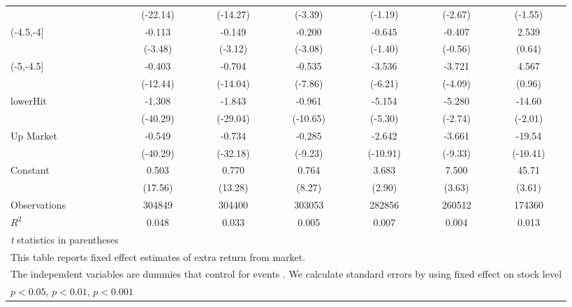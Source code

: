 {\begin{tabular}{l*{6}{c}}
                    &    (-22.14)         &    (-14.27)         &     (-3.39)         &     (-1.19)         &     (-2.67)         &     (-1.55)         \\
[1em]
(-4.5,-4]           &      -0.113\sym{***}&      -0.149\sym{**} &      -0.200\sym{**} &      -0.645         &      -0.407         &       2.539         \\
                    &     (-3.48)         &     (-3.12)         &     (-3.08)         &     (-1.40)         &     (-0.56)         &      (0.64)         \\
[1em]
(-5,-4.5]           &      -0.403\sym{***}&      -0.704\sym{***}&      -0.535\sym{***}&      -3.536\sym{***}&      -3.721\sym{***}&       4.567         \\
                    &    (-12.44)         &    (-14.04)         &     (-7.86)         &     (-6.21)         &     (-4.09)         &      (0.96)         \\
[1em]
lowerHit            &      -1.308\sym{***}&      -1.843\sym{***}&      -0.961\sym{***}&      -5.154\sym{***}&      -5.280\sym{**} &      -14.60\sym{*}  \\
                    &    (-40.29)         &    (-29.04)         &    (-10.65)         &     (-5.30)         &     (-2.74)         &     (-2.01)         \\
[1em]
Up Market           &      -0.549\sym{***}&      -0.734\sym{***}&      -0.285\sym{***}&      -2.642\sym{***}&      -3.661\sym{***}&      -19.54\sym{***}\\
                    &    (-40.29)         &    (-32.18)         &     (-9.23)         &    (-10.91)         &     (-9.33)         &    (-10.41)         \\
[1em]
Constant            &       0.503\sym{***}&       0.770\sym{***}&       0.764\sym{***}&       3.683\sym{**} &       7.500\sym{***}&       45.71\sym{***}\\
                    &     (17.56)         &     (13.28)         &      (8.27)         &      (2.90)         &      (3.63)         &      (3.61)         \\
\hline
Observations        &      304849         &      304400         &      303053         &      282856         &      260512         &      174360         \\
\(R^{2}\)           &       0.048         &       0.033         &       0.005         &       0.007         &       0.004         &       0.013         \\
\hline\hline
\multicolumn{7}{l}{\footnotesize \textit{t} statistics in parentheses}\\
\multicolumn{7}{l}{\footnotesize This table reports fixed effect estimates of extra return from market.}\\
\multicolumn{7}{l}{\footnotesize The independent variables are dummies that control for events . We calculate standard errors by using fixed effect on stock level}\\
\multicolumn{7}{l}{\footnotesize \sym{*} \(p<0.05\), \sym{**} \(p<0.01\), \sym{***} \(p<0.001\)}\\
\end{tabular}
}
